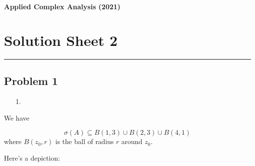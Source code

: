 \documentclass[12pt,a4paper]{article}
\begin{document}
\textbf{Applied Complex Analysis (2021)}

\section{Solution Sheet 2}
\rule{\textwidth}{1pt}
\subsection{Problem 1}
\begin{itemize}
\item[1. ] \end{itemize}
We have

\[
\sigma(A) \subseteq B(1,3) \cup B(2,3) \cup B(4,1)
\]
where $B(z_0,r)$ is the ball of radius $r$ around $z_0$.

Here's a depiction:
\end{document}
